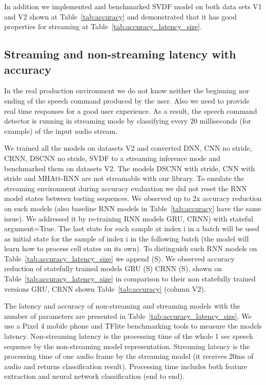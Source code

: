 \documentclass[a4paper]{article}
\begin{document}
In addition we implemented and benchmarked SVDF model\cite{SVDF1} on both data sets V1 and V2 shown at Table~\ref{tab:accuracy} and demonstrated that it has good properties for streaming at Table~\ref{tab:accuracy_latency_size}.




\subsection{Streaming and non-streaming latency with accuracy}

In the real production environment we do not know neither the beginning nor ending of the speech command produced by the user. Also we need to provide real time responses for a good user experience. As a result, the speech command detector is running in streaming mode by classifying every 20 milliseconds (for example) of the input audio stream.

We trained all the models on datasets V2 and converted DNN, CNN no stride, CRNN, DSCNN no stride, SVDF to a streaming inference mode and benchmarked them on datasets V2. The models DSCNN with stride, CNN with stride and MHAtt-RNN are not streamable with our library. To emulate the streaming environment during accuracy evaluation we did not reset the RNN model states between testing sequences. We observed up to 2x accuracy reduction on such models (also baseline RNN models in Table~\ref{tab:accuracy} have the same issue). We addressed it by re-training RNN models  GRU, CRNN) with stateful argument=True\cite{STA}. The last state for each sample at index i in a batch will be used as initial state for the sample of index i in the following batch (the model will learn how to process cell states on its own). To distinguish such RNN models on Table~\ref{tab:accuracy_latency_size} we append (S). We observed accuracy reduction of statefully trained models GRU (S) CRNN (S), shown on Table~\ref{tab:accuracy_latency_size} in comparison to their non statefully trained versions GRU, CRNN shown Table~\ref{tab:accuracy} (column V2).

The latency and accuracy of non-streaming and streaming models with the number of parameters are presented in Table~\ref{tab:accuracy_latency_size}. We use a Pixel 4 mobile phone\cite{PIXEL4} and TFlite benchmarking tools \cite{BENCH} to measure the models latency. Non-streaming latency is the processing time of the whole 1 sec speech sequence by the non-streaming model representation. Streaming latency is the processing time of one audio frame by the streaming model (it receives 20ms of audio and returns classification result). Processing time includes both feature extraction and neural network classification (end to end).
\end{document}
